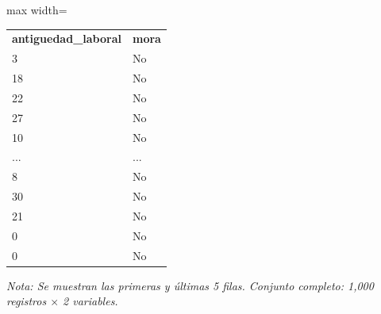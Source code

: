 

\begin{table}[htbp]

\centering

\begin{adjustbox}{max width=\textwidth}

\begin{tabular}{ll}

\rowcolor{ThemeBackground}
\rule{0pt}{0.45cm}
\textcolor{ThemeGold}{\bfseries antiguedad\_laboral} & \textcolor{ThemeGold}{\bfseries mora} \\

3 & No \\
18 & No \\
22 & No \\
27 & No \\
10 & No \\
... & ... \\
8 & No \\
30 & No \\
21 & No \\
0 & No \\
0 & No \\
\bottomrule
\end{tabular}

\end{adjustbox}

\vspace{0.15cm}
{\raggedright\sffamily\footnotesize\color{ThemeMuted}
\textit{Nota: Se muestran las primeras y últimas 5 filas. Conjunto completo: 1,000 registros $\times$ 2 variables.}}

\end{table}
